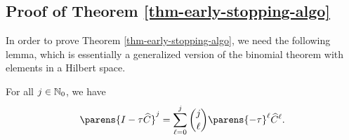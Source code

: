 \subsection{Proof of Theorem \ref{thm-early-stopping-algo}}\label{proof-theorem-early-stopping-algo}

In order to prove Theorem \ref{thm-early-stopping-algo}, we need the following lemma, which is essentially a generalized version of the binomial theorem with elements in a Hilbert space. 

\begin{lemma}\label{lemma-binomial-C}
	For all $j \in \mathbb{N}_0$, we have 
	\begin{align}\label{eq-lemma-bonimial-C-1}
		\parens{I - \tau \widehat{C}}^j = \sum_{\ell=0}^j {j \choose \ell} \parens{-\tau}^{\ell} \widehat{C}^{\ell}. 
	\end{align}
\end{lemma}

